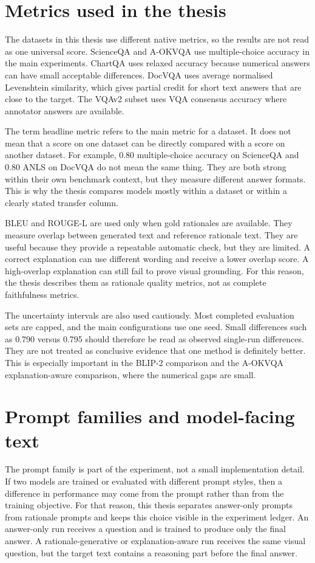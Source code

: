 \documentclass[12pt,bibliography=totoc,listof=totoc,BCOR=5mm,DIV=12,oneside,open=any]{scrbook}
\begin{document}
\section{Metrics used in the thesis}
The datasets in this thesis use different native metrics, so the results are not read as one universal score.
ScienceQA and A-OKVQA use multiple-choice accuracy in the main experiments.
ChartQA uses relaxed accuracy because numerical answers can have small acceptable differences.
DocVQA uses average normalised Levenshtein similarity, which gives partial credit for short text answers that are close to the target.
The VQAv2 subset uses VQA consensus accuracy where annotator answers are available.

The term headline metric refers to the main metric for a dataset.
It does not mean that a score on one dataset can be directly compared with a score on another dataset.
For example, 0.80 multiple-choice accuracy on ScienceQA and 0.80 ANLS on DocVQA do not mean the same thing.
They are both strong within their own benchmark context, but they measure different answer formats.
This is why the thesis compares models mostly within a dataset or within a clearly stated transfer column.

BLEU and ROUGE-L are used only when gold rationales are available.
They measure overlap between generated text and reference rationale text.
They are useful because they provide a repeatable automatic check, but they are limited.
A correct explanation can use different wording and receive a lower overlap score.
A high-overlap explanation can still fail to prove visual grounding.
For this reason, the thesis describes them as rationale quality metrics, not as complete faithfulness metrics.

The uncertainty intervals are also used cautiously.
Most completed evaluation sets are capped, and the main configurations use one seed.
Small differences such as 0.790 versus 0.795 should therefore be read as observed single-run differences.
They are not treated as conclusive evidence that one method is definitely better.
This is especially important in the BLIP-2 comparison and the A-OKVQA explanation-aware comparison, where the numerical gaps are small.

\section{Prompt families and model-facing text}
The prompt family is part of the experiment, not a small implementation detail.
If two models are trained or evaluated with different prompt styles, then a difference in performance may come from the prompt rather than from the training objective.
For that reason, this thesis separates answer-only prompts from rationale prompts and keeps this choice visible in the experiment ledger.
An answer-only run receives a question and is trained to produce only the final answer.
A rationale-generative or explanation-aware run receives the same visual question, but the target text contains a reasoning part before the final answer.
\end{document}
